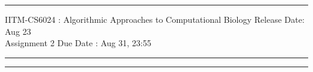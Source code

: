 \documentclass[solution,addpoints,12pt]{exam}
\begin{document}
\hrule
\vspace{3mm}
\noindent 
{\sf IITM-CS6024 : Algorithmic Approaches to Computational Biology  \hfill Release Date: Aug 23}
\vspace{3mm}\\
\noindent 
{\sf Assignment 2 \hfill Due Date : Aug 31, 23:55 }
\vspace{3mm}
\hrule
\vspace{3mm}




\vspace{3mm}
\hrule
\end{document}
